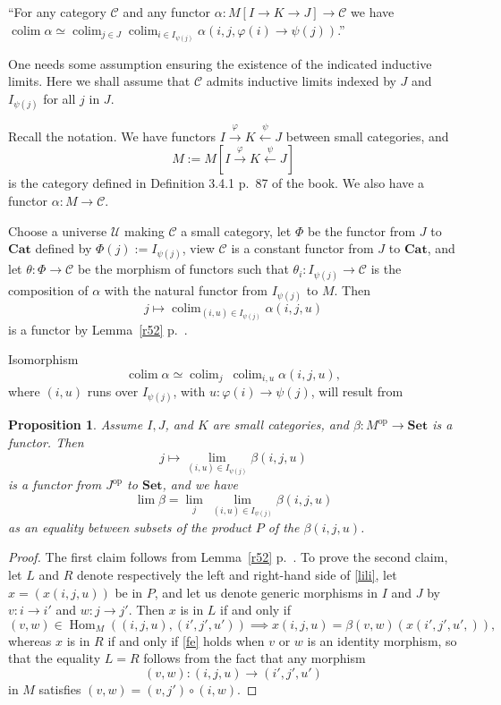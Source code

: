 \documentclass[12pt]{article}
\newtheorem{prop}[thm]{Proposition}
\theoremstyle{remark}
\theoremstyle{definition}
\newcommand{\C}{\mathcal C}
\newcommand{\U}{\mathcal U}
\newcommand{\Cat}{\mathbf{Cat}}%
\newcommand{\Set}{\mathbf{Set}}
\DeclareMathOperator*{\co}{colim}
\DeclareMathOperator{\Hom}{Hom}%
\DeclareMathOperator{\op}{op}
\begin{document}
``For any category $\C$ and any functor $\alpha:M[I\to K\rightarrow J]\to\C$ we have $\co\alpha\simeq\co_{j\in J}\co_{i\in I_{\psi(j)}}\alpha(i,j,\varphi(i)\to\psi(j))$.'' 

One needs some assumption ensuring the existence of the indicated inductive limits. Here we shall assume that $\C$ admits inductive limits indexed by $J$ and $I_{\psi(j)}$ for all $j$ in $J$. 

Recall the notation. We have functors $I\xrightarrow\varphi K\xleftarrow\psi J$ between small categories, and 
$$
M:=M[I\xrightarrow\varphi K\xleftarrow\psi J] 
$$ 
is the category defined in Definition 3.4.1 p.~87 of the book. We also have a functor $\alpha:M\to\C$. 

Choose a universe $\U$ making $\C$ a small category, let $\Phi$ be the functor from $J$ to $\Cat$ defined by $\Phi(j):=I_{\psi(j)}$, view $\C$ is a constant functor from $J$ to $\Cat$, and let $\theta:\Phi\to\C$ be the morphism of functors such that $\theta_i:I_{\psi(j)}\to\C$ is the composition of $\alpha$ with the natural functor from $I_{\psi(j)}$ to $M$. Then 
$$
j\mapsto\co_{(i,u)\in I_{\psi(j)}}\alpha(i,j,u) 
$$ 
is a functor by Lemma~\ref{r52} p.~\pageref{r52}. 

Isomorphism 
%
\begin{equation}\label{coco2}
\co\alpha\simeq\co_j\ \co_{i,u}\alpha(i,j,u),
\end{equation} 
%
where $(i,u)$ runs over $I_{\psi(j)}$, with $u:\varphi(i)\to\psi(j)$, will result from 
%
\begin{prop}
%
Assume $I,J$, and $K$ are small categories, and $\beta:M^{\op}\to\Set$ is a functor. Then 
$$
j\mapsto\lim_{(i,u)\in I_{\psi(j)}}\beta(i,j,u)
$$ 
is a functor from $J^{\op}$ to $\Set$, and we have
%
\begin{equation}\label{lili} 
\lim\beta=\lim_j\ \lim_{(i,u)\in I_{\psi(j)}}\beta(i,j,u) 
\end{equation} 
%
as an equality between subsets of the product $P$ of the $\beta(i,j,u)$. 
%
\end{prop} 
%
\begin{proof}
The first claim follows from Lemma~\ref{r52} p.~\pageref{r52}. To prove the second claim, let $L$ and $R$ denote respectively the left and right-hand side of \eqref{lili}, let $x=(x(i,j,u))$ be in $P$, and let us denote generic morphisms in $I$ and $J$ by $v:i\to i'$ and $w:j\to j'$. Then $x$ is in $L$ if and only if 
%
\begin{equation}\label{fe} 
(v,w)\in\Hom_M((i,j,u),(i',j',u'))\implies x(i,j,u)=\beta(v,w)(x(i',j',u',)), 
\end{equation} 
%
whereas $x$ is in $R$ if and only if \eqref{fe} holds when $v$ or $w$ is an identity morphism, so that the equality $L=R$ follows from the fact that any morphism 
$$
(v,w):(i,j,u)\to(i',j',u')
$$ 
in $M$ satisfies $(v,w)=(v,j')\circ(i,w)$.
\end{proof}
\end{document}
